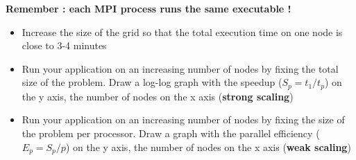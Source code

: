 \documentclass[11pt,a4paper]{article}
\begin{document}
\begin{exercise}
{\bf Remember : each MPI process runs the same executable !}
\\

\begin{itemize}
	\item{ Increase the size of the grid so that the total execution time on one node is close to 3-4 minutes }
	\item{ Run your application on an increasing number of nodes by fixing the total size of the problem. Draw a log-log graph with the speedup ($S_p = t_1/t_p$) on the y axis, the number of nodes on the x axis (\textbf{strong scaling})}
	\item{ Run your application on an increasing number of nodes by fixing the size of the problem per processor. Draw a graph with the parallel efficiency ($E_p = S_p/p$) on the y axis, the number of nodes on the x axis (\textbf{weak scaling}) }	
\end{itemize}
\end{exercise}
\end{document}
